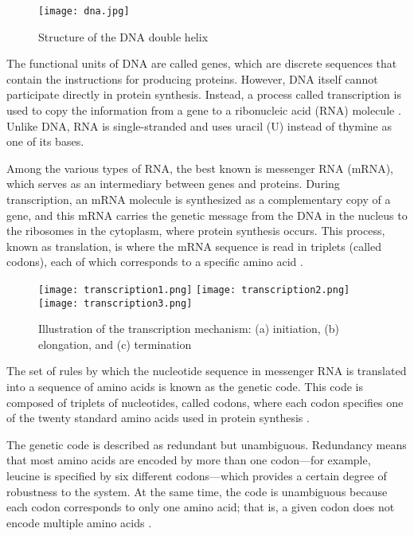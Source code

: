 \begin{figure}[h]
\centering
\texttt{[image: dna.jpg]}
\caption{Structure of the DNA double helix}
\label{fig:dna}
\end{figure}

The functional units of DNA are called genes, which are discrete sequences that contain the instructions for producing proteins. However, 
DNA itself cannot participate directly in protein synthesis. Instead, a process called transcription is used to copy the information 
from a gene to a ribonucleic acid (RNA) molecule \textcite{basic_biology_NCBI2002}. Unlike DNA, RNA is single-stranded and uses uracil (U) 
instead of thymine as one of its bases.

Among the various types of RNA, the best known is messenger RNA (mRNA), which serves as an intermediary between genes and proteins. 
During transcription, an mRNA molecule is synthesized as a complementary copy of a gene, and this mRNA carries the genetic message 
from the DNA in the nucleus to the ribosomes in the cytoplasm, where protein synthesis occurs. This process, known as translation, 
is where the mRNA sequence is read in triplets (called codons), each of which corresponds to a specific amino acid \textcite{central_dogma_molecular}.

\begin{figure}[h]
\centering
\texttt{[image: transcription1.png]}
\texttt{[image: transcription2.png]}
\texttt{[image: transcription3.png]}
\caption{Illustration of the transcription mechanism: (a) initiation, (b) elongation, and (c) termination}
\label{fig:transcription}
\end{figure}

The set of rules by which the nucleotide sequence in messenger RNA is translated into a sequence of amino acids is known as 
the genetic code. This code is composed of triplets of nucleotides, called codons, where each codon specifies one of the twenty 
standard amino acids used in protein synthesis \textcite{genetic_codeNovozhilov2008O}.

The genetic code is described as redundant but unambiguous. Redundancy means that most amino acids are encoded by more than 
one codon—for example, leucine is specified by six different codons—which provides a certain degree of robustness to the system. 
At the same time, the code is unambiguous because each codon corresponds to only one amino acid; that is, a given codon does not 
encode multiple amino acids \textcite{ConceptsBiology_DNA}.

